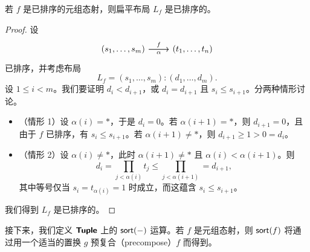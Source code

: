 \begin{proposition}\label{sortmorphisminCproposition}
    若 $f$ 是已排序的元组态射，则扁平布局 $L_f$ 是已排序的。
\end{proposition}

\begin{proof}
    设
    \[\begin{tikzcd} (s_1,\dots,s_m) \ar[r,"f"] \ar[r,swap,"\alpha"] &  (t_1,\dots,t_n) \end{tikzcd} \]
    已排序，并考虑布局
    \[L_f = (s_1,\dots,s_m):(d_1,\dots,d_m).\] 设 $1 \leq i < m$。我们要证明 $d_i < d_{i+1}$，或 $d_i = d_{i+1}$ 且 $s_i \leq s_{i+1}$。分两种情形讨论。
    \begin{itemize}
    \item （情形 1）设 $\alpha(i) = *$，于是 $d_i = 0$。若 $\alpha(i+1) = *$，则 $d_{i+1} = 0$，且由于 $f$ 已排序，有 $s_i \leq s_{i+1}$。若 $\alpha(i+1) \neq *$，则 $d_{i+1} \geq 1 > 0 = d_i$。

    \item （情形 2）设 $\alpha(i) \neq *$，此时 $\alpha(i+1) \neq *$ 且 $\alpha(i) < \alpha(i+1)$。则
        \[
        d_i = \prod_{j<\alpha(i)}t_j \leq \prod_{j < \alpha(i+1)} = d_{i+1},
        \]
    其中等号仅当 $ s_i = t_{\alpha(i)} = 1$ 时成立，而这蕴含 $s_i \leq s_{i+1}$。
    \end{itemize}
    我们得到 $L_f$ 是已排序的。
\end{proof}

\noindent 接下来，我们定义 ${\boldsymbol{\mathsf{Tuple}}}$ 上的 $\mathsf{sort}(-)$ 运算。若 $f$ 是元组态射，则 $\mathsf{sort}(f)$ 将通过用一个适当的置换 $g$ 预复合（precompose）$f$ 而得到。

